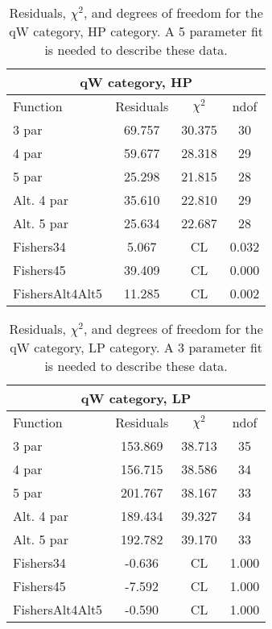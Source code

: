 \begin{table}[htb]
\centering
\begin{tabular}{|l c c c |}
\hline
\multicolumn{4}{|c|}{qW category, HP}\\
\hline
Function & Residuals & $\chi^2$ & ndof \\
\hline
3 par & 69.757 & 30.375 & 30 \\
4 par & 59.677 & 28.318 & 29 \\
5 par & 25.298 & 21.815 & 28 \\
Alt. 4 par& 35.610 & 22.810 & 29 \\
Alt. 5 par& 25.634 & 22.687 & 28 \\
\hline
\hline
Fishers34  & 5.067 & CL & 0.032\\
Fishers45  & 39.409 & CL & 0.000\\
FishersAlt4Alt5  & 11.285 & CL & 0.002\\
\hline
\end{tabular}
\caption{Residuals, $\chi^{2}$, and degrees of freedom for the qW category, HP category. A 5 parameter fit is needed to describe these data.}
\label{tab:qW category, HP}
\end{table}
\begin{table}[htb]
\centering
\begin{tabular}{|l c c c |}
\hline
\multicolumn{4}{|c|}{qW category, LP}\\
\hline
Function & Residuals & $\chi^2$ & ndof \\
\hline
3 par & 153.869 & 38.713 & 35 \\
4 par & 156.715 & 38.586 & 34 \\
5 par & 201.767 & 38.167 & 33 \\
Alt. 4 par& 189.434 & 39.327 & 34 \\
Alt. 5 par& 192.782 & 39.170 & 33 \\
\hline
\hline
Fishers34  & -0.636 & CL & 1.000\\
Fishers45  & -7.592 & CL & 1.000\\
FishersAlt4Alt5  & -0.590 & CL & 1.000\\
\hline
\end{tabular}
\caption{Residuals, $\chi^{2}$, and degrees of freedom for the qW category, LP category. A 3 parameter fit is needed to describe these data.}
\label{tab:qW category, LP}
\end{table}
